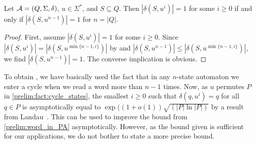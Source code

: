 \begin{corollary} 	\label{prelim:fact:unary_sync_word}
 Let $\mathcal A = (Q, \Sigma, \delta)$, $u \in \Sigma^*$, and $S \subseteq Q$.
 Then $|\delta(S, u^i)| = 1$ for some $i \ge 0$
 if and only if $|\delta(S, u^{n - 1})| = 1$ for $n = |Q|$.
\end{corollary}
\begin{proof}
  First, assume $|\delta(S, u^i)| = 1$ for some $i \ge 0$.
  Since $|\delta(S, u^{i})| = |\delta(S, u^{\min\{n-1, i\}})|$
  by  
  and $|\delta(S, u^{n - 1})| \le |\delta(S, u^{\min\{n-1, i\}})|$, 
  we find $|\delta(S, u^{n - 1})| = 1$.
  The converse implication is obvious.
\end{proof}

\begin{remark}
To obtain ,
we have basically used the fact that in any $n$-state automaton 
we enter a cycle when we read a word more than $n-1$ times.
Now, as $u$ permutes $P$ in \cref{prelim:fact:cycle_states},
the smallest $i \ge 0$ such that $\delta(q, u^i) = q$
for all $q \in P$
is asymptotically equal to $\exp((1+o(1))\sqrt{(|P|\ln{|P|})}$
by a result from Landau~\cite{landau03}.
This can be used to improve the bound from \cref{prelim:word_in_PA}
asymptotically. However, as 
the bound given is sufficient for our applications,
we do not bother to state a more precise bound.
\end{remark}